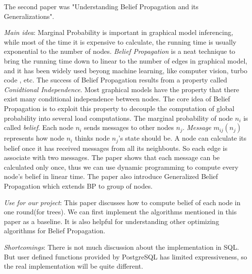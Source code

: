 The second paper was "Understanding Belief Propagation and its Generalizations".
\cite{bp}
\begin{itemize*}
\item {\em Main idea}: Marginal Probability is important in graphical model inferencing, while most of the time it is expensive to calculate, the running time is usually exponential to the number of nodes. \emph{Belief Propagation} is a neat technique to bring the running time down to linear to the number of edges in graphical model, and it has been widely used beyong machine learning, like computer vision\cite{felzenszwalb2006efficient}, turbo code 
\cite{mceliece1998turbo}, etc. The success of Belief Propagation results from a property called \emph{Conidtional Independence}. Most graphical models have the property that there exist many conditional independence between nodes. The core idea of Belief Propagation is to exploit this property to decouple the computation of global probability into several load computations. The marginal probability of node $n_{i}$ is called \emph{belief}. Each node $n_{i}$ sends messages to other nodes $n_{j}$. \emph{Message} $m_{ij}(n_{j})$ represents how node $n_{i}$ thinks node $n_{j}$'s state should be. A node can calculate its belief once it has received messages from all its neighbouts. So each edge is associate with two messages. The paper shows that each message can be calculated only once, thus we can use dynamic programming to compute every node's belief in linear time. The paper also introduce Generalized Belief Propagation which extends BP to group of nodes.
\item {\em Use for our project}:
      This paper discusses how to compute belief of each node in one round(for trees). We can first implement the algorithms mentioned in this paper as a baseline. It is also helpful for understanding other optimizing algorithms for Belief Propagation. 
\item {\em Shortcomings}:
       There is not much discussion about the implementation in SQL. But user defined functions provided by PostgreSQL has limited expressiveness, so the real implementation will be quite different.
\end{itemize*}


